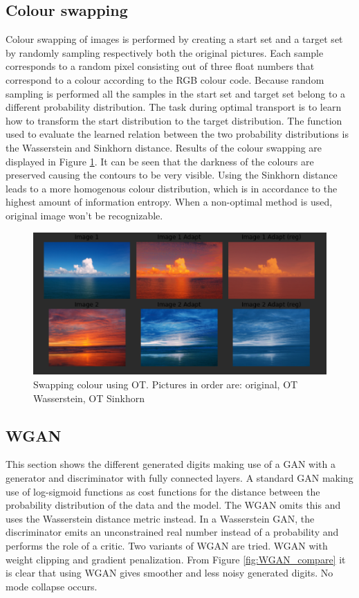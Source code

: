 \documentclass[a4paper,10pt]{article}
\begin{document}
\subsection{Colour swapping}
Colour swapping of images is performed by creating a start set and a target set by randomly sampling respectively both the original pictures. Each sample corresponds to a random pixel consisting out of three float numbers that correspond to a colour according to the RGB colour code. Because random sampling is performed all the samples in the start set and target set belong to a different probability distribution. The task during optimal transport is to learn how to transform the start distribution to the target distribution. The function used to evaluate the learned relation between the two probability distributions is the Wasserstein and Sinkhorn distance. Results of the colour swapping are displayed in Figure \ref{fig:switch colour}. It can be seen that the darkness of the colours are preserved causing the contours to be very visible. Using the Sinkhorn distance leads to a more homogenous colour distribution, which is in accordance to the highest amount of information entropy. When a non-optimal method is used, original image won't be recognizable. 

\begin{figure}[h]
	\centering
	\includegraphics[width=0.5\linewidth]{OT_pictures.png}
	\caption{Swapping colour using OT. Pictures in order are: original, OT Wasserstein, OT Sinkhorn}
	\label{fig:switch colour}
\end{figure}

\subsection{WGAN}
This section shows the different generated digits making use of a GAN with a generator and discriminator with fully connected layers. 
A standard GAN making use of log-sigmoid functions as cost functions for the distance between the probability distribution of the data and the model. The WGAN omits this and uses the Wasserstein distance metric instead. In a Wasserstein GAN, the discriminator emits an unconstrained real number instead of a probability and performs the role of a critic. Two variants of WGAN are tried. WGAN with weight clipping and gradient penalization. From Figure \ref{fig:WGAN_compare} it is clear that using WGAN gives smoother and less noisy generated digits. No mode collapse occurs.
\end{document}
